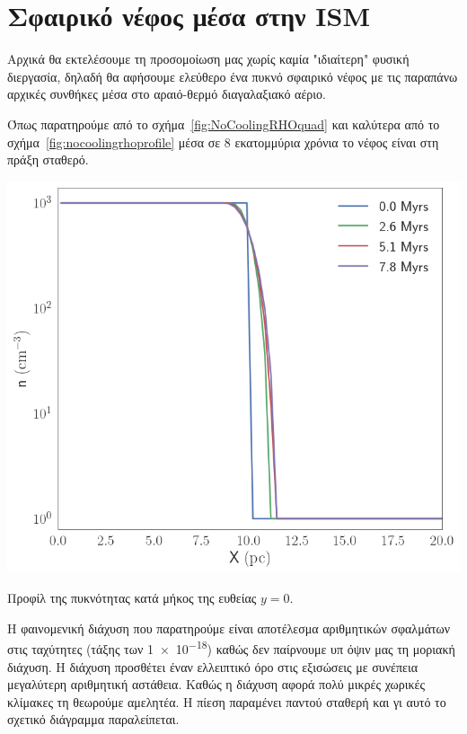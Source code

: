 	
	\section{Σφαιρικό νέφος μέσα στην ISM}

	Αρχικά θα εκτελέσουμε τη προσομοίωση μας χωρίς καμία "ιδιαίτερη" φυσική διεργασία, δηλαδή θα αφήσουμε ελεύθερο ένα πυκνό σφαιρικό νέφος με τις παραπάνω αρχικές συνθήκες μέσα στο αραιό-θερμό διαγαλαξιακό αέριο.
	
 Όπως παρατηρούμε από το σχήμα~\ref{fig:NoCoolingRHOquad} και καλύτερα από το σχήμα~\ref{fig:nocoolingrhoprofile} μέσα σε 8 εκατομμύρια χρόνια το νέφος είναι στη πράξη σταθερό. 
 
 \begin{marginfigure}
 	\centering
 	\includegraphics[width=1.0\linewidth]{DataImages/NoCoolingRHOprofile}
 	\caption{Προφίλ της πυκνότητας κατά μήκος της ευθείας $y=0$.}
 	\label{fig:nocoolingrhoprofile}
 \end{marginfigure}	
 
  Η φαινομενική διάχυση που παρατηρούμε είναι αποτέλεσμα αριθμητικών σφαλμάτων στις ταχύτητες (τάξης των \num{1e-18}) καθώς δεν παίρνουμε υπ όψιν μας τη μοριακή διάχυση. Η διάχυση προσθέτει έναν ελλειπτικό όρο στις εξισώσεις με συνέπεια μεγαλύτερη αριθμητική αστάθεια. Καθώς η διάχυση αφορά πολύ μικρές χωρικές κλίμακες τη θεωρούμε αμελητέα.
  Η πίεση παραμένει παντού σταθερή και γι αυτό το σχετικό διάγραμμα παραλείπεται.  
 	
